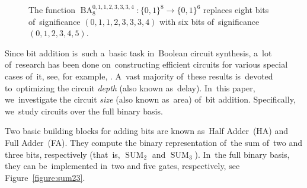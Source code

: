 \documentclass[a4paper, UKenglish, cleveref, autoref,  thm-restate, anonymous]{lipics-v2021}
\DeclareMathOperator{\SUM}{SUM}
\DeclareMathOperator{\BA}{BA}
\begin{document}
    \begin{figure}[ht]
        \begin{center}
        \end{center}
        \caption{The function $\BA_8^{0,1,1,2,3,3,3,4} \colon \{0,1\}^8 \to \{0,1\}^6$ replaces eight bits of~significance $(0,1,1,2,3,3,3,4)$ with six bits of~significance $(0,1,2,3,4,5)$.}
        \label{figure:baexample}
    \end{figure}

    Since bit addition is~such a~basic task in~Boolean circuit synthesis,
    a~lot of~research has been done on~constructing efficient circuits
    for various special cases of~it, see, for example,
    \cite{DBLP:journals/cc/PatersonZ93,
        DBLP:conf/arith/MartelORS95,
        DBLP:journals/tc/StellingMOR98,
        DBLP:conf/arith/BickerstaffSS01}.
    A~vast majority of~these results is~devoted to~optimizing the circuit \emph{depth} (also known as~delay).
    In~this paper, we~investigate the circuit \emph{size} (also known as~area) of~bit addition. Specifically, we~study circuits over the full binary basis.

    Two basic building blocks for adding bits are known as~Half Adder~(HA)
    and Full Adder~(FA). They compute the binary representation of~the sum
    of~two and three bits, respectively (that~is, $\SUM_2$ and $\SUM_3$).
    In~the full binary basis, they can be~implemented in~two and five gates, respectively, see Figure~\ref{figure:sum23}.
\end{document}
